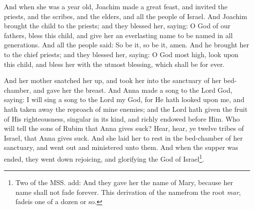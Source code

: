\pend\pstart
And when she was a year old, Joachim made a great feast, and invited the priests, and the scribes, and the elders, and all the people of Israel. And Joachim brought the child to the priests; and they blessed her, saying: O God of our fathers, bless this child, and give her an everlasting name to be named in all generations. And all the people said: So be it, so be it, amen. And he brought her to the chief priests; and they blessed her, saying: O God most high, look upon this child, and bless her with the utmost blessing, which shall be for ever.

\pend\pstart
And her mother snatched her up, and took her into the sanctuary of her bed-chamber, and gave her the breast. And Anna made a song to the Lord God, saying: I will sing a song to the Lord my God, for He hath looked upon me, and hath taken away the reproach of mine enemies; and the Lord hath given the fruit of His righteousness, singular in its kind, and richly endowed before Him. Who will tell the sons of Rubim that Anna gives suck? Hear, hear, ye twelve tribes of Israel, that Anna gives suck. And she laid her to rest in the bed-chamber of her sanctuary, and went out and ministered unto them. And when the supper was ended, they went down rejoicing, and glorifying the God of Israel\footnote{Two of the MSS. add: And they gave her the name of Mary, because her name shall not fade forever. This derivation of the name\textemdash from the root \textit{mar}, fade\textemdash is one of a dozen or so.}.

\pend\pstart
{}

\pend
